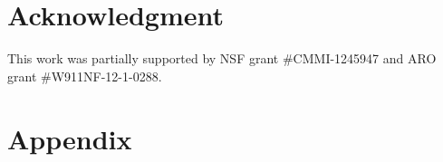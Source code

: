 \documentclass[%
 reprint,
nofootinbib,
nobibnotes,
 amsmath,amssymb,
]{revtex4-1}
\begin{document}
\maketitle















\section*{Acknowledgment}
This work was partially supported by NSF grant \#CMMI-1245947 and ARO
grant \#W911NF-12-1-0288.

\section{Appendix}
\end{document}
